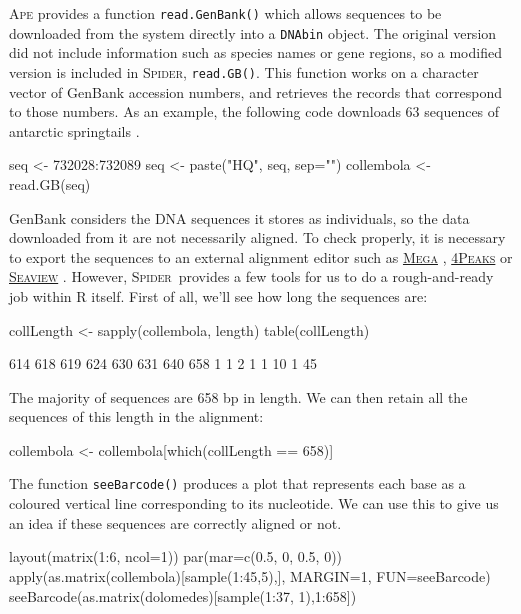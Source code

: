 \documentclass{article}
\newcommand{\spider}{\textsc{Spider}~} %
\newcommand{\Spider}{\textsc{Spider}} %
\newcommand{\progname}[1]{\textsc{#1}}
\newcommand{\fun}[1]{\texttt{#1}}
\begin{document}
\progname{Ape} provides a function \fun{read.GenBank()} which allows sequences to be downloaded from the system directly into a \fun{DNAbin} object. The original version did not include information such as species names or gene regions, so a modified version is included in \Spider, \fun{read.GB()}. This function works on a character vector of GenBank accession numbers, and retrieves the records that correspond to those numbers. As an example, the following code downloads 63 sequences of antarctic springtails \citep{Green.etal.2011}.

\begin{console}
seq <- 732028:732089
seq <- paste("HQ", seq, sep="")
collembola <- read.GB(seq)
\end{console}

GenBank considers the DNA sequences it stores as individuals, so the data downloaded from it are not necessarily aligned. To check properly, it is necessary to export the sequences to an external alignment editor such as \href{http://www.megasoftware.net}{\progname{Mega}} \citep{SW.Tamu.etal.2011.MEGA}, \href{http://www.mekentosj.com/science/4peaks}{\progname{4Peaks}} or \href{http://pbil.univ-lyon1.fr/software/seaview.html}{\progname{Seaview}} \citep{SW.Guoy.etal.2010.SeaView}. However,  \spider provides a few tools for us to do a rough-and-ready job within \progname{R} itself. First of all, we'll see how long the sequences are:

\begin{console}
collLength <- sapply(collembola, length)
table(collLength)
\end{console}

\begin{Routput}
 614 618 619 624 630 631 640 658 
  1   1   2   1   1  10   1  45
\end{Routput}

The majority of sequences are 658 bp in length. We can then retain all the sequences of this length in the alignment:

\begin{console}
collembola <- collembola[which(collLength == 658)]
\end{console}

The function \fun{seeBarcode()} produces a plot that represents each base as a coloured vertical line corresponding to its nucleotide. We can use this to give us an idea if these sequences are correctly aligned or not.

\begin{console}
layout(matrix(1:6, ncol=1))
par(mar=c(0.5, 0, 0.5, 0))
apply(as.matrix(collembola)[sample(1:45,5),], MARGIN=1, FUN=seeBarcode)
seeBarcode(as.matrix(dolomedes)[sample(1:37, 1),1:658])
\end{console}
\end{document}
